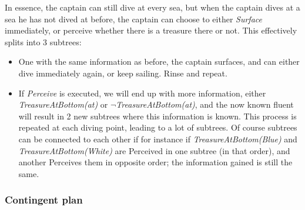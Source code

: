 \documentclass[a4paper, 11pt]{article}
\begin{document}

In essence, the captain can still dive at every sea, but when the captain dives at a sea he has not dived at before, the captain can choose to either \textit{Surface} immediately, or perceive whether there is a treasure there or not. This effectively splits into 3 subtrees:

\begin{itemize}
	\item One with the same information as before, the captain surfaces, and can either dive immediately again, or keep sailing. Rinse and repeat.
	\item If \textit{Perceive} is executed, we will end up with more information, either \textit{TreasureAtBottom(at)} or \textit{$\neg$TreasureAtBottom(at)}, and the now known fluent will result in 2 new subtrees where this information is known. This process is repeated at each diving point, leading to a lot of subtrees. Of course subtrees can be connected to each other if for instance if \textit{TreasureAtBottom(Blue)} and \textit{TreasureAtBottom(White)} are Perceived in one subtree (in that order), and another Perceives them in opposite order; the information gained is still the same. 
\end{itemize}



\subsubsection{Contingent plan}
\end{document}
